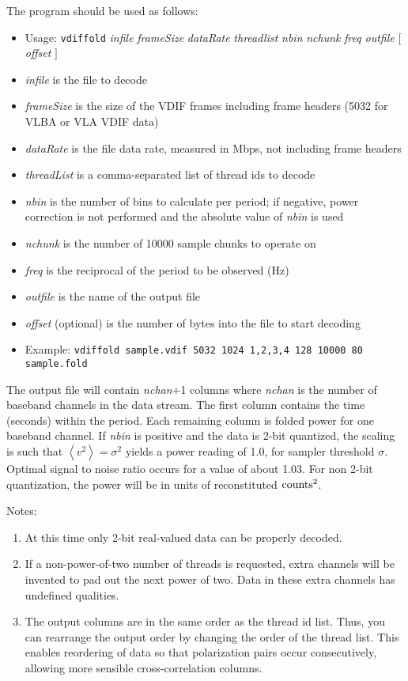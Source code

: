 The program should be used as follows:

\begin{itemize}
\item[] Usage: {\tt vdiffold} {\em infile} {\em frameSize} {\em dataRate} {\em threadlist} {\em nbin} {\em nchunk} {\em freq} {\em outfile} $[$ {\em offset} $]$ 
\item[] {\em infile} is the file to decode
\item[] {\em frameSize} is the size of the VDIF frames including frame headers (5032 for VLBA or VLA VDIF data)
\item[] {\em dataRate} is the file data rate, measured in Mbps, not including frame headers
\item[] {\em threadList} is a comma-separated list of thread ids to decode
\item[] {\em nbin} is the number of bins to calculate per period; if negative, power correction is not performed and the absolute value of {\em nbin} is used
\item[] {\em nchunk} is the number of 10000 sample chunks to operate on
\item[] {\em freq} is the reciprocal of the period to be observed (Hz)
\item[] {\em outfile} is the name of the output file
\item[] {\em offset} (optional) is the number of bytes into the file to start decoding
\item[] Example: {\tt vdiffold sample.vdif 5032 1024 1,2,3,4 128 10000 80 sample.fold}
\end{itemize}

The output file will contain {\em nchan}+1 columns where {\em nchan} is the number of baseband channels in the data stream.
The first column contains the time (seconds) within the period.
Each remaining column is folded power for one baseband channel.
If {\em nbin} is positive and the data is 2-bit quantized, the scaling is such that $\left<v^2\right> = \sigma^2$ yields a power reading of 1.0, for sampler threshold $\sigma$.
Optimal signal to noise ratio occurs for a value of about 1.03.
For non 2-bit quantization, the power will be in units of reconstituted ${\rm counts}^2$.

\noindent
Notes:
\begin{enumerate}
\item At this time only 2-bit real-valued data can be properly decoded.
\item If a non-power-of-two number of threads is requested, extra channels will be invented to pad out the next power of two.
Data in these extra channels has undefined qualities.
\item The output columns are in the same order as the thread id list.
Thus, you can rearrange the output order by changing the order of the thread list.
This enables reordering of data so that polarization pairs occur consecutively, allowing more sensible cross-correlation columns.
\end{enumerate}





